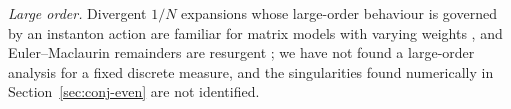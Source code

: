 \emph{Large order.} Divergent $1/N$ expansions whose large-order behaviour is governed by an instanton action are familiar for matrix
models with varying weights \cite{MarinoSchiappaWeiss}, and Euler--Maclaurin remainders are resurgent \cite{CostinGaroufalidis}; we have
not found a large-order analysis for a fixed discrete measure, and the singularities found numerically in
Section~\ref{sec:conj-even} are not identified.
